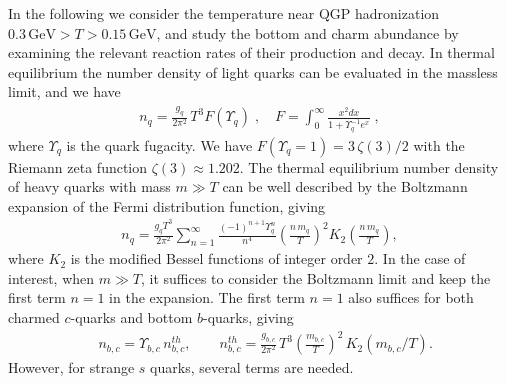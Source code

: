 In the following we consider the temperature near QGP hadronization $0.3\,\mathrm{GeV}>T>0.15\,\mathrm{GeV}$, and study the bottom and charm abundance by examining the relevant reaction rates of their production and decay.
In thermal equilibrium the number density of light quarks can be evaluated in the massless limit, and we have
\begin{align}\label{FermiN}
n_q=\frac{g_{q}}{2\pi^2}\,T^3 F(\Upsilon_q)\;, \quad F=\int_0^\infty \frac{x^2dx}{1+\Upsilon_q^{-1}e^x}\;,
\end{align}
where $\Upsilon_q$ is the quark fugacity. We have $ F(\Upsilon_q=1)=3\,\zeta(3)/2$ with the Riemann zeta function $\zeta(3)\approx1.202$.
The thermal equilibrium number density of heavy quarks with mass $m\gg T$ can be well described by the Boltzmann expansion of the Fermi distribution function, giving
\begin{align}\label{BoltzN}
n_{q}\!=\!\frac{g_{q}T^3}{2\pi^2}\sum_{n=1}^{\infty}\frac{(-1)^{n+1}\Upsilon_q^n}{n^4}\left(\frac{n\,m_{q}}{T}\right)^{\!2}\!K_2\left(\frac{n\,m_{q}}{T}\right),
\end{align} 
where $K_2$ is the modified Bessel functions of integer order $2$. In the case of interest, when $m\gg T$, it suffices to consider the Boltzmann limit and  keep the first term $n=1$ in the expansion. The first term  $n=1$ also suffices for both charmed $c$-quarks and bottom $b$-quarks, giving
\begin{align}
&n_{b,c}={\Upsilon_{b,c}\,}n^{th}_{b,c},\qquad n^{th}_{b,c}=\frac{g_{b,c}}{2\pi^2}\,T^3\left(\frac{m_{b,c}}{T}\right)^2\,K_2(m_{b,c}/T).
\end{align}
However, for strange $s$ quarks, several terms are needed. 


